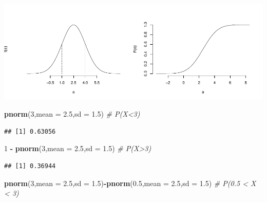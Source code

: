 \documentclass[
  11pt,
]{book}
\newenvironment{Shaded}{\begin{snugshade}}{\end{snugshade}}
\newcommand{\AttributeTok}[1]{\textcolor[rgb]{0.13,0.29,0.53}{#1}}
\newcommand{\CommentTok}[1]{\textcolor[rgb]{0.56,0.35,0.01}{\textit{#1}}}
\newcommand{\DecValTok}[1]{\textcolor[rgb]{0.00,0.00,0.81}{#1}}
\newcommand{\FloatTok}[1]{\textcolor[rgb]{0.00,0.00,0.81}{#1}}
\newcommand{\FunctionTok}[1]{\textcolor[rgb]{0.13,0.29,0.53}{\textbf{#1}}}
\newcommand{\NormalTok}[1]{#1}
\newcommand{\SpecialCharTok}[1]{\textcolor[rgb]{0.81,0.36,0.00}{\textbf{#1}}}
\theoremstyle{mytheoremstyle}
\theoremstyle{mydefstyle}
\begin{document}
\begin{center}\includegraphics{Appunti_di_Statistica_2025_files/figure-latex/24-Libro-42,-1} \end{center}

\begin{Shaded}
\begin{Highlighting}[]
\FunctionTok{pnorm}\NormalTok{(}\DecValTok{3}\NormalTok{,}\AttributeTok{mean =} \FloatTok{2.5}\NormalTok{,}\AttributeTok{sd =} \FloatTok{1.5}\NormalTok{)      }\CommentTok{\# P(X\textless{}3)}
\end{Highlighting}
\end{Shaded}

\begin{verbatim}
## [1] 0.63056
\end{verbatim}

\begin{Shaded}
\begin{Highlighting}[]
\DecValTok{1} \SpecialCharTok{{-}} \FunctionTok{pnorm}\NormalTok{(}\DecValTok{3}\NormalTok{,}\AttributeTok{mean =} \FloatTok{2.5}\NormalTok{,}\AttributeTok{sd =} \FloatTok{1.5}\NormalTok{)  }\CommentTok{\# P(X\textgreater{}3)}
\end{Highlighting}
\end{Shaded}

\begin{verbatim}
## [1] 0.36944
\end{verbatim}

\begin{Shaded}
\begin{Highlighting}[]
\FunctionTok{pnorm}\NormalTok{(}\DecValTok{3}\NormalTok{,}\AttributeTok{mean =} \FloatTok{2.5}\NormalTok{,}\AttributeTok{sd =} \FloatTok{1.5}\NormalTok{)}\SpecialCharTok{{-}}\FunctionTok{pnorm}\NormalTok{(}\FloatTok{0.5}\NormalTok{,}\AttributeTok{mean =} \FloatTok{2.5}\NormalTok{,}\AttributeTok{sd =} \FloatTok{1.5}\NormalTok{) }\CommentTok{\#  P(0.5 \textless{} X \textless{} 3)}
\end{Highlighting}
\end{Shaded}
\end{document}
